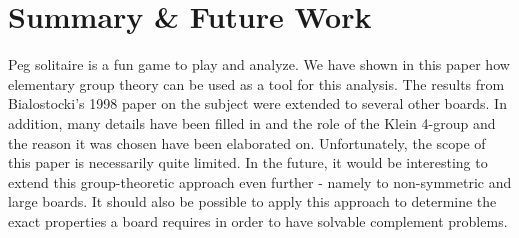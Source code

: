 \documentclass[11pt]{article}
\begin{document}
\section{Summary \& Future Work}
Peg solitaire is a fun game to play and analyze. We have shown in this paper how elementary group theory can be used as a tool for this analysis. The results from Bialostocki's 1998 paper on the subject were extended to several other boards. In addition, many details have been filled in and the role of the Klein 4-group and the reason it was chosen have been elaborated on. Unfortunately, the scope of this paper is necessarily quite limited. In the future, it would be interesting to extend this group-theoretic approach even further - namely to non-symmetric and large boards. It should also be possible to apply this approach to determine the exact properties a board requires in order to have solvable complement problems.



\end{document}
